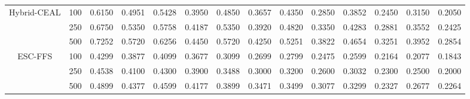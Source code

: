 \documentclass[preprint,12pt]{elsarticle}
\begin{document}
\begin{table}[!t]
{\begin{tabular}{cc|cc|cc|cc|cc|cc|cc}
 Hybrid-CEAL &  100       &  0.6150          &  0.4951                &  0.5428          &  0.3950                &  0.4850          &  0.3657                &  0.4350          &  0.2850                &  0.3852          &  0.2450                &  0.3150          &  0.2050          \\
                          &  250       &  0.6750          &  0.5350                &  0.5758          &  0.4187                &  0.5350          &  0.3920                &  0.4820          &  0.3350                &  0.4283          &  0.2881                &  0.3552          &  0.2425          \\
                          &  500       &  0.7252          &  0.5720                &  0.6256          &  0.4450                &  0.5720          &  0.4250                &  0.5251          &  0.3822                &  0.4654          &  0.3251                &  0.3952          &  0.2854          \\ \hline
                          
ESC-FFS                   & 100      & 0.4299          & \multicolumn{1}{l|}{0.3877}          & 0.4099          & \multicolumn{1}{l|}{0.3677}          & 0.3099          & \multicolumn{1}{l|}{0.2699}          & 0.2799          & \multicolumn{1}{l|}{0.2475}          & 0.2599          & \multicolumn{1}{l|}{0.2164}          & 0.2077          & 0.1843          \\
                          & 250      & 0.4538          & \multicolumn{1}{l|}{0.4100}          & 0.4300          & \multicolumn{1}{l|}{0.3900}          & 0.3488          & \multicolumn{1}{l|}{0.3000}          & 0.3200          & \multicolumn{1}{l|}{0.2600}          & 0.3032          & \multicolumn{1}{l|}{0.2300}          & 0.2500          & 0.2000          \\
                          & 500      & 0.4899          & \multicolumn{1}{l|}{0.4377}          & 0.4599          & \multicolumn{1}{l|}{0.4177}          & 0.3899          & \multicolumn{1}{l|}{0.3471}          & 0.3499          & \multicolumn{1}{l|}{0.3077}          & 0.3299          & \multicolumn{1}{l|}{0.2327}          & 0.2677          & 0.2264          \\ \hline                        


\end{tabular}}
\end{table}
\end{document}
